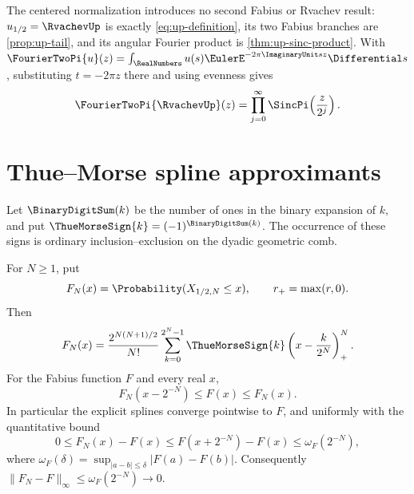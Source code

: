 The centered normalization introduces no second Fabius or Rvachev result:
\(u_{1/2}=\RvachevUp\) is exactly \cref{eq:up-definition}, its two Fabius
branches are \cref{prop:up-tail}, and its angular Fourier product is
\cref{thm:up-sinc-product}.  With
\(\FourierTwoPi{u}(z)=\int_\RealNumbers
u(s)\EulerE^{-2\pi\ImaginaryUnit sz}\Differential s\), substituting
\(t=-2\pi z\) there and using evenness gives
\[
 \FourierTwoPi{\RvachevUp}(z)
 =\prod_{j=0}^{\infty}\SincPi\!\left(\frac{z}{2^j}\right).
\]

\section{Thue--Morse spline approximants}
\label{sec:fr-thue-morse}

Let \(\BinaryDigitSum(k)\) be the number of ones in the binary expansion of \(k\), and put
\(\ThueMorseSign{k}=(-1)^{\BinaryDigitSum(k)}\).  The occurrence of these signs is ordinary
inclusion--exclusion on the dyadic geometric comb.

\begin{corollary}
\label{thm:fr-thue-morse-splines}
For \(N\ge1\), put
\[
 F_N(x)=\Probability(X_{1/2,N}\le x),
 \qquad r_+=\max(r,0).
\]
Then
\begin{equation}
 F_N(x)=\frac{2^{N(N+1)/2}}{N!}
 \sum_{k=0}^{2^N-1}\ThueMorseSign{k}
 \left(x-\frac{k}{2^N}\right)_+^N.
 \label{eq:fr-thue-morse-spline}
\end{equation}
For the Fabius function \(F\) and every real \(x\),
\begin{equation}
 F_N(x-2^{-N})\le F(x)\le F_N(x).
 \label{eq:fr-spline-sandwich}
\end{equation}
In particular the explicit splines converge pointwise to \(F\), and uniformly
with the quantitative bound
\begin{equation}
 0\le F_N(x)-F(x)
 \le F(x+2^{-N})-F(x)
 \le \omega_F(2^{-N}),
 \label{eq:fr-spline-uniform-bound}
\end{equation}
where
\(\omega_F(\delta)=\sup_{|a-b|\le\delta}|F(a)-F(b)|\).  Consequently
\(\|F_N-F\|_\infty\le\omega_F(2^{-N})\to0\).
\end{corollary}

